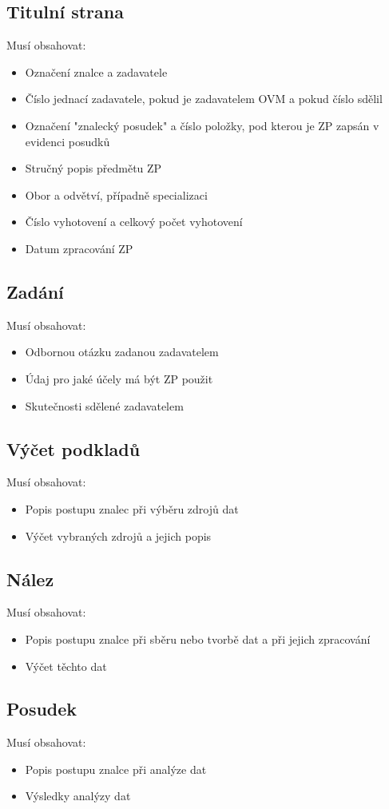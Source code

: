 \subsection{Titulní strana}
Musí obsahovat:
\begin{itemize}
    \item Označení znalce a zadavatele
    \item Číslo jednací zadavatele, pokud je zadavatelem OVM a pokud číslo sdělil
    \item Označení "znalecký posudek" a číslo položky, pod kterou je ZP zapsán v evidenci posudků
    \item Stručný popis předmětu ZP
    \item Obor a odvětví, případně specializaci
    \item Číslo vyhotovení a celkový počet vyhotovení
    \item Datum zpracování ZP
\end{itemize}
\subsection{Zadání}
Musí obsahovat:
\begin{itemize}
    \item Odbornou otázku zadanou zadavatelem
    \item Údaj pro jaké účely má být ZP použit
    \item Skutečnosti sdělené zadavatelem
\end{itemize}
\subsection{Výčet podkladů}
Musí obsahovat:
\begin{itemize}
    \item Popis postupu znalec při výběru zdrojů dat
    \item Výčet vybraných zdrojů a jejich popis
\end{itemize}
\subsection{Nález}
Musí obsahovat:
\begin{itemize}
    \item Popis postupu znalce při sběru nebo tvorbě dat a při jejich zpracování
    \item Výčet těchto dat
\end{itemize}
\subsection{Posudek}
Musí obsahovat:
\begin{itemize}
    \item Popis postupu znalce při analýze dat
    \item Výsledky analýzy dat
\end{itemize}

